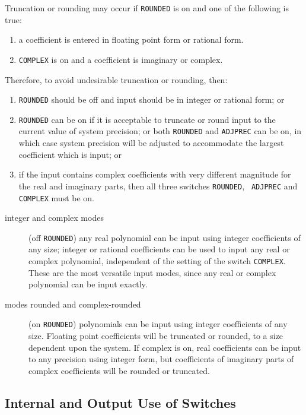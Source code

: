 Truncation or rounding may occur if {\tt ROUNDED} is on and
one of the following is true:

\begin{enumerate}
\item a coefficient is entered in floating point form or rational form.
\item {\tt COMPLEX} is on and a coefficient is imaginary or complex.
\end{enumerate}

Therefore, to avoid undesirable truncation or rounding, then:

\begin{enumerate}
\item {\tt ROUNDED} should be off and input should be
in integer or rational form; or
\item {\tt ROUNDED} can be on if it is acceptable to truncate or round
input to the current value of system precision; or both {\tt ROUNDED} and
{\tt ADJPREC} can be on, in which case system precision will be adjusted
to accommodate the largest coefficient which is input; or \item if the
input contains complex coefficients with very different magnitude for the
real and imaginary parts, then all three switches {\tt ROUNDED}, {\tt
ADJPREC} and {\tt COMPLEX} must be on.
\end{enumerate}

\begin{description}
\item[integer and complex modes] (off {\tt ROUNDED}) any real
polynomial can be input using integer coefficients of any size; integer or
rational coefficients can be used to input any real or complex polynomial,
independent of the setting of the switch {\tt COMPLEX}.  These are the most
versatile input modes, since any real or complex polynomial can be input
exactly.

\item[modes rounded and complex-rounded] (on {\tt ROUNDED}) polynomials can be 
input using
integer coefficients of any size.  Floating point coefficients will be
truncated or rounded, to a size dependent upon the system.  If complex
is on, real coefficients can be input to any precision using integer
form, but coefficients of imaginary parts of complex coefficients will
be rounded or truncated.
\end{description}

\subsection{Internal and Output Use of Switches}

